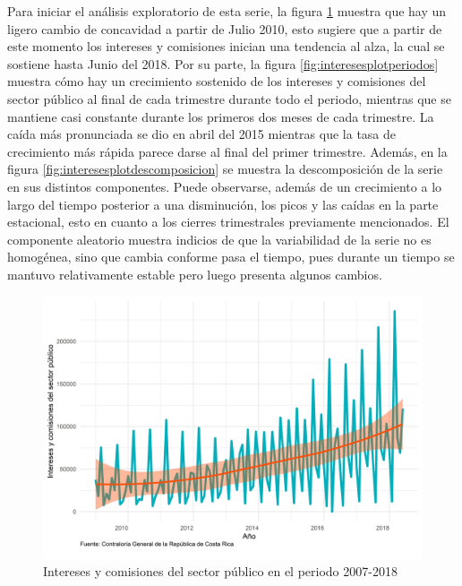 \documentclass[
]{article}
\begin{document}
Para iniciar el análisis exploratorio de esta serie, la figura
\ref{fig:interesesplotgeneral} muestra que hay un ligero cambio de
concavidad a partir de Julio 2010, esto sugiere que a partir de este
momento los intereses y comisiones inician una tendencia al alza, la
cual se sostiene hasta Junio del 2018. Por su parte, la figura
\ref{fig:interesesplotperiodos} muestra cómo hay un crecimiento
sostenido de los intereses y comisiones del sector público al final de
cada trimestre durante todo el periodo, mientras que se mantiene casi
constante durante los primeros dos meses de cada trimestre. La caída más
pronunciada se dio en abril del 2015 mientras que la tasa de crecimiento
más rápida parece darse al final del primer trimestre. Además, en la
figura \ref{fig:interesesplotdescomposicion} se muestra la
descomposición de la serie en sus distintos componentes. Puede
observarse, además de un crecimiento a lo largo del tiempo posterior a
una disminución, los picos y las caídas en la parte estacional, esto en
cuanto a los cierres trimestrales previamente mencionados. El componente
aleatorio muestra indicios de que la variabilidad de la serie no es
homogénea, sino que cambia conforme pasa el tiempo, pues durante un
tiempo se mantuvo relativamente estable pero luego presenta algunos
cambios.

\begin{figure}[H]
\includegraphics[width=1\linewidth,height=1\textheight]{Tesis_files/figure-latex/interesesplotgeneral-1} \caption{Intereses y comisiones del sector público en el periodo 2007-2018}\label{fig:interesesplotgeneral}
\end{figure}
\end{document}
